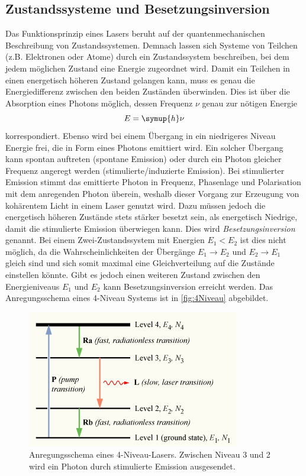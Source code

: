 \subsection{Zustandssysteme und Besetzungsinversion}
\label{subsec:Theorie_Zustandssysteme}
Das Funktionsprinzip eines Lasers beruht auf der quantenmechanischen Beschreibung von Zustandssystemen. Demnach lassen sich Systeme von Teilchen (z.B. Elektronen oder Atome)
durch ein Zustandssystem beschreiben, bei dem jedem möglichen Zustand eine Energie zugeordnet wird. Damit ein Teilchen in einen energetisch höheren Zustand gelangen kann,
muss es genau die Energiedifferenz zwischen den beiden Zuständen überwinden. Dies ist über die Absorption eines Photons möglich, dessen Frequenz $\nu$ genau zur nötigen 
Energie 
\begin{equation}
    \label{eqn:E}
    E = \symup{h}\nu
\end{equation}
korrespondiert. Ebenso wird bei einem Übergang in ein niedrigeres Niveau Energie frei, die in Form eines Photons emittiert wird. Ein solcher 
Übergang kann spontan auftreten (spontane Emission) oder durch ein Photon gleicher Frequenz angeregt werden (stimulierte/induzierte Emission). Bei stimulierter Emission
stimmt das emittierte Photon in Frequenz, Phasenlage und Polarisation mit dem anregenden Photon überein, weshalb dieser Vorgang zur Erzeugung von kohärentem Licht in einem 
Laser genutzt wird. Dazu müssen jedoch die energetisch höheren Zustände stets stärker besetzt sein, als energetisch Niedrige, damit die stimulierte Emission überwiegen kann. 
Dies wird \textit{Besetzungsinversion} genannt. Bei einem Zwei-Zustandssystem mit Energien $E_1 < E_2$ ist dies nicht möglich, da die Wahrscheinlichkeiten der Übergänge
$E_1 \to E_2$ und $E_2 \to E_1$ gleich sind und sich somit maximal eine Gleichverteilung auf die Zustände einstellen könnte. Gibt es jedoch einen weiteren Zustand zwischen
den Energieniveaus $E_1$ und $E_2$ kann Besetzungsinversion erreicht werden. Das Anregungsschema eines 4-Niveau Systems ist in \autoref{fig:4Niveau} abgebildet.
\begin{figure}
    \centering
    \includegraphics[scale=0.58]{content/pics/Population-inversion-4level.png}
    \caption{Anregungsschema eines 4-Niveau-Lasers. Zwischen Niveau 3 und 2 wird ein Photon durch stimulierte Emission ausgesendet. \cite{wikipedia_population_inversion}}
    \label{fig:4Niveau}
\end{figure}
